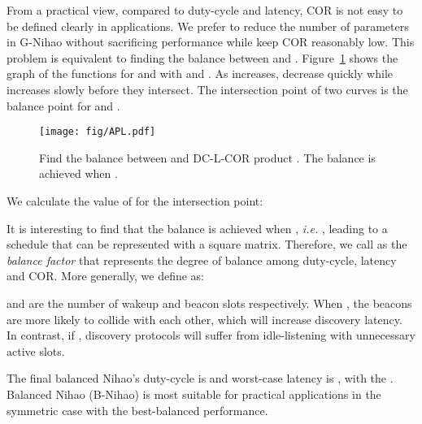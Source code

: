 \documentclass[conference]{IEEEtran}
\begin{document}
From a practical view, compared to duty-cycle and latency, COR is not easy to be defined clearly in applications.
We prefer to reduce the number of parameters in G-Nihao without sacrificing performance while keep COR reasonably low.
This problem is equivalent to finding the balance between  and .
Figure~\ref{apl} shows the graph of the functions for  and  with  and .
As  increases,  decrease quickly while  increases slowly before they intersect.
The intersection point of two curves is the balance point for  and .

\begin{figure}[t]
    \centering
    \texttt{[image: fig/APL.pdf]}
    \caption{Find the balance between  and DC-L-COR product . The balance is achieved when .}\label{apl}
\end{figure}

We calculate the value of  for the intersection point:

It is interesting to find that the balance is achieved when , \emph{i.e.} ,
leading to a schedule that can be represented with a square matrix.
Therefore, we call  as the \emph{balance factor} that represents the degree of balance among duty-cycle, latency and COR.
More generally, we define  as:

 and  are the number of wakeup and beacon slots respectively.
When , the beacons are more likely to collide with each other, which will increase discovery latency.
In contrast, if , discovery protocols will suffer from idle-listening with unnecessary active slots.

The final balanced Nihao's duty-cycle is  and worst-case latency is , with the .
Balanced Nihao (B-Nihao) is most suitable for practical applications in the symmetric case with the best-balanced performance.
\end{document}
